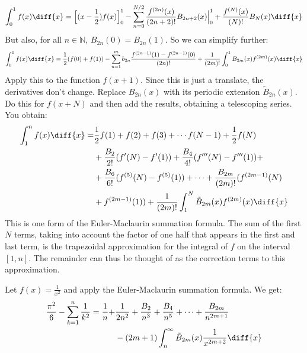 \documentclass[crop=false,class=book,oneside]{standalone}
\begin{document}
        \begin{equation}
            \int_{0}^{1}f(x)\diff{x}=
            \Big[(x-\frac{1}{2})f(x)\Big]_{0}^{1}-
            \sum_{n=0}^{N/2}\frac{f^{(2n)}(x)}{(2n+2)!}B_{2n+2}(x)
                \Big|_{0}^{1}+\frac{f^{(N)}(x)}{(N)!}B_{N}(x)\diff{x}
        \end{equation}
        But also, for all $n\in\mathbb{N}$, $B_{2n}(0)=B_{2n}(1)$. So we can
        simplify further:
        \begin{equation}
            \int_{0}^{1}f(x)\diff{x}=\frac{1}{2}(f(0)+f(1))-
            \sum_{n=1}^{m}b_{2n}\frac{f^{(2n-1)}(1)-f^{(2n-1)}(0)}{(2n)!}
            +\frac{1}{(2m)!}\int_{0}^{1}B_{2m}(x)f^{(2m)}(x)\diff{x}
        \end{equation}
        Apply this to the function $f(x+1)$. Since this is just a translate,
        the derivatives don't change. Replace $B_{2n}(x)$ with its
        periodic extension $\tilde{B}_{2n}(x)$. Do this for $f(x+N)$ and
        then add the results, obtaining a telescoping series. You obtain:
        \begin{equation}
            \begin{split}
                \int_{1}^{n}f(x)\diff{x}
                    =&\frac{1}{2}f(1)+f(2)+f(3)+
                        \cdots{f}(N-1)+\frac{1}{2}f(N)\\
                        &+\frac{B_{2}}{2!}(f'(N)-f'(1))+
                        \frac{B_{4}}{4!}(f'''(N)-f'''(1))+\\
                        &+\frac{B_{6}}{6!}(f^{(5)}(N)-f^{(5)}(1))+\cdots+
                        \frac{B_{2m}}{(2m)!}(f^{(2m-1)}(N)\\
                        &+f^{(2m-1)}(1))+\frac{1}{(2m)!}\int_{1}^{N}
                        \tilde{B}_{2m}(x)f^{(2m)}(x)\diff{x}
            \end{split}
        \end{equation}
        This is one form of the Euler-Maclaurin summation formula. The sum
        of the first $N$ terms, taking into account the factor of one half
        that appears in the first and last term, is the trapezoidal
        approximation for the integral of $f$ on the interval $[1,n]$. The
        remainder can thus be thought of as the correction terms to this
        approximation.
        \begin{lexample}
            Let $f(x)=\frac{1}{x^{2}}$ and apply the Euler-Maclaurin
            summation formula. We get:
            \begin{equation}
                \begin{split}
                    \frac{\pi^{2}}{6}-\sum_{k=1}^{n}\frac{1}{k^{2}}
                    =\frac{1}{n}+
                        &\frac{1}{2n^{2}}+\frac{B_{2}}{n^{3}}+
                        \frac{B_{4}}{n^{5}}+\cdots+
                        \frac{B_{2m}}{n^{2m+1}}\\
                        &-(2m+1)\int_{n}^{\infty}
                            \tilde{B}_{2m}(x)\frac{1}{x^{2m+2}}\diff{x}
                \end{split}
            \end{equation}
        \end{lexample}
\end{document}
